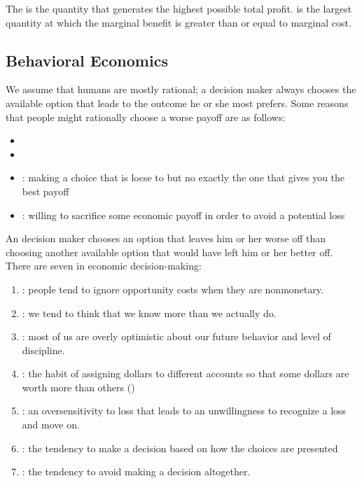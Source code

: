 \documentclass{article}
\begin{document}
The  is the quantity that generates the highest possible total profit.  is the largest quantity at which the marginal benefit is greater than or equal to marginal cost. 

\subsection{Behavioral Economics}

We assume that humans are mostly rational; a  decision maker always chooses the available option that leads to the outcome he or she most prefers. Some reasons that people might rationally choose a worse payoff are as follows: 
\begin{itemize}
  \item {} 
  \item {}
  \item {}: making a choice that is locse to but no exactly the one that gives you the best payoff
  \item {}: willing to sacrifice some economic payoff in order to avoid a potential loss
\end{itemize}
An  decision maker chooses an option that leaves him or her worse off than choosing another available option that would have left him or her better off. There are seven  in economic decision-making:
\begin{enumerate}
  \item {}: people tend to ignore opportunity costs when they are nonmonetary. 
  \item {}: we tend to think that we know more than we actually do.
  \item {}: most of us are overly optimistic about our future behavior and level of discipline. 
  \item {}: the habit of assigning dollars to different accounts so that some dollars are worth more than others ()
  \item {}: an oversensitivity to loss that leads to an unwillingness to recognize a loss and move on. 
  \item {}: the tendency to make a decision based on how the choices are presented 
  \item {}: the tendency to avoid making a decision altogether. 
\end{enumerate}
\end{document}
